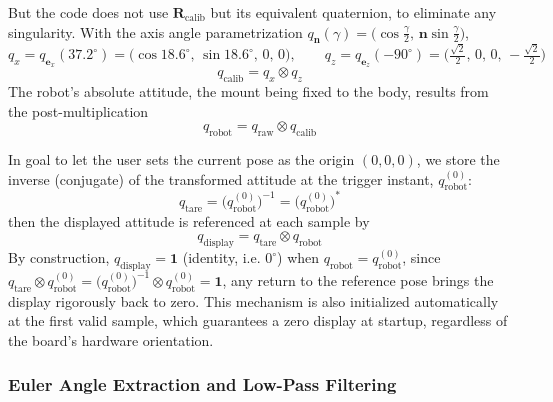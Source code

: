 \documentclass{tropLaClasse}
\begin{document}
But the code does not use $\mathbf{R}_{\text{calib}}$ but its equivalent quaternion, to eliminate any singularity. With the axis angle parametrization $q_{\mathbf{n}}(\gamma)=\big(\cos\tfrac{\gamma}{2},\,\mathbf{n}\sin\tfrac{\gamma}{2}\big)$,
\begin{equation}
q_x=q_{\mathbf{e}_x}(37{.}2^\circ)=\big(\cos 18{.}6^\circ,\,\sin 18{.}6^\circ,\,0,\,0\big),
\qquad
q_z=q_{\mathbf{e}_z}(-90^\circ)=\Big(\tfrac{\sqrt{2}}{2},\,0,\,0,\,-\tfrac{\sqrt{2}}{2}\Big)
\end{equation}
\begin{equation}
\boxed{\,q_{\text{calib}}=q_x\otimes q_z\,}
\label{eq:qcalib}
\end{equation}
The robot's absolute attitude, the mount being fixed to the body, results from the post-multiplication
\begin{equation}
\boxed{\,q_{\text{robot}}=q_{\text{raw}}\otimes q_{\text{calib}}\,}
\label{eq:qrobot}
\end{equation}

In goal to let the user sets the current pose as the origin $(0,0,0)$, we store the inverse (conjugate) of the transformed attitude at the trigger instant, $q_{\text{robot}}^{(0)}$:
\begin{equation}
q_{\text{tare}}=\big(q_{\text{robot}}^{(0)}\big)^{-1}=\big(q_{\text{robot}}^{(0)}\big)^{*}
\label{eq:qtare}
\end{equation}
then the displayed attitude is referenced at each sample by
\begin{equation}
\boxed{\,q_{\text{display}}=q_{\text{tare}}\otimes q_{\text{robot}}\,}
\label{eq:qdisplay}
\end{equation}
By construction, $q_{\text{display}}=\mathbf{1}$ (identity, i.e. $0^\circ$) when $q_{\text{robot}}=q_{\text{robot}}^{(0)}$, since $q_{\text{tare}}\otimes q_{\text{robot}}^{(0)}=\big(q_{\text{robot}}^{(0)}\big)^{-1}\otimes q_{\text{robot}}^{(0)}=\mathbf{1}$, any return to the reference pose brings the display rigorously back to zero. This mechanism is also initialized automatically at the first valid sample, which guarantees a zero display at startup, regardless of the board's hardware orientation.

\subsubsection{Euler Angle Extraction and Low-Pass Filtering}
\label{subsubsec:extract_filter}
\end{document}
